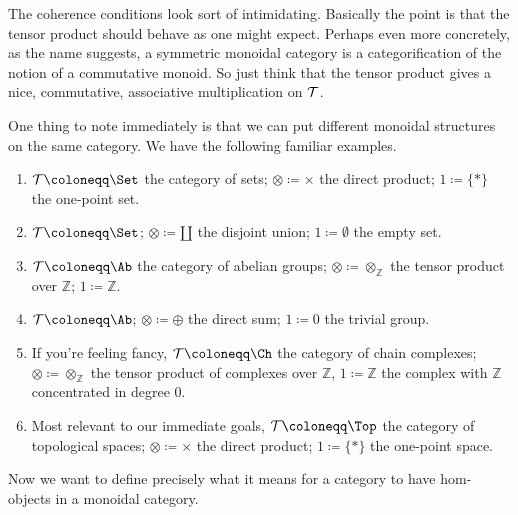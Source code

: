 \begin{remark}
  The coherence conditions look sort of intimidating. Basically the
  point is that the tensor product should behave as one might
  expect. Perhaps even more concretely, as the name suggests, a
  symmetric monoidal category is a categorification of the notion of a
  commutative monoid. So just think that the tensor product gives a
  nice, commutative, associative multiplication on $\mathcal{T}$.
\end{remark}

\renewcommand{\Z}{\mathbb{Z}}

\begin{examples}
  \label{examples-monoidal}
  One thing to note immediately is that we can put different monoidal
  structures on the same category. We have the following familiar
  examples.
  \begin{enumerate}
  \item $\T \coloneqq \Set$ the category of sets; $\otimes \coloneqq
    \times$ the direct product; $1 \coloneqq \{*\}$ the one-point set.
  \item $\T \coloneqq \Set$; $\otimes \coloneqq \amalg$ the disjoint
    union; $1 \coloneqq \emptyset$ the empty set.
  \item $\T \coloneqq \Ab$ the category of abelian groups; $\otimes
    \coloneqq \otimes_\Z$ the tensor product over $\Z$; $1 \coloneqq
    \Z$.
  \item $\T \coloneqq \Ab$; $\otimes \coloneqq \oplus$ the direct sum;
    $1 \coloneqq 0$ the trivial group.
  \item If you're feeling fancy, $\T \coloneqq \Ch$ the category of
    chain complexes; $\otimes \coloneqq \otimes_\Z$ the tensor product
    of complexes over $\Z$, $1 \coloneqq \Z$ the complex with $\Z$
    concentrated in degree $0$.
  \item Most relevant to our immediate goals, $\T \coloneqq \Top$ the
    category of topological spaces; $\otimes \coloneqq \times$ the
    direct product; $1 \coloneqq \{*\}$ the one-point space.
  \end{enumerate}
\end{examples}

Now we want to define precisely what it means for a category to have
hom-objects in a monoidal category.

